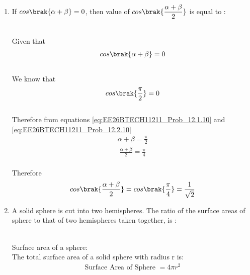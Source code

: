 \begin{enumerate}[label=\thesubsection.\arabic*, ref=\thesubsection.\theenumi]
\item
If $cos\brak{\alpha + \beta} = 0$, then value of $cos\brak{\dfrac{\alpha + \beta}{2} }$ is equal to :
\begin{enumerate}
\end{enumerate}
\solution
\\Given that \begin{align}cos\brak{\alpha + \beta} = 0 \label{eq:EE26BTECH11211_Prob_12.1.10}
\end{align}
\\We know that \begin{align}cos\brak{\frac{\pi}{2}} = 0 \label{eq:EE26BTECH11211_Prob_12.2.10}
\end{align}  
\\Therefore from equations \eqref{eq:EE26BTECH11211_Prob_12.1.10} and \eqref{eq:EE26BTECH11211_Prob_12.2.10}
\begin{align} \alpha + \beta = \frac{\pi}{2}
\end{align}
\begin{align} \frac{\alpha + \beta}{2} = \frac{\pi}{4}
\end{align}
\\Therefore
 \begin{align}
 cos\brak{\frac{\alpha + \beta}{2}} = cos\brak{\frac{\pi}{4}} = \frac{1}{\sqrt{2}}
 \end{align}
\item
A solid sphere is cut into two hemispheres. The ratio of the surface areas of sphere to that of two hemispheres taken together, is : 
\begin{enumerate}
\end{enumerate}
\solution
\\Surface area of a sphere:
\\The total surface area of a solid sphere with radius r is:
\begin{align}\text{Surface\ Area\ of\ Sphere }= 4\pi r^2\end{align}

\end{enumerate}
